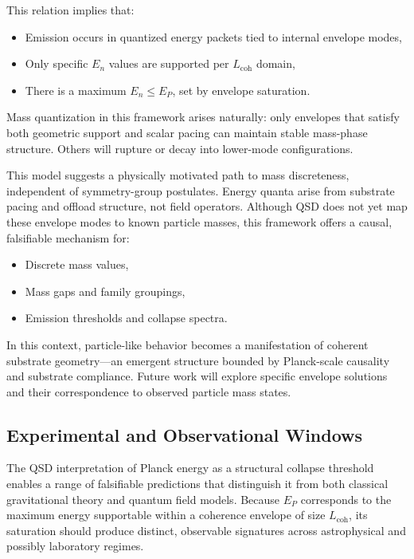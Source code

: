 \documentclass[entropy,article,submit,pdftex,moreauthors]{Definitions/mdpi}
\begin{document}
This relation implies that:
\begin{itemize}
  \item Emission occurs in quantized energy packets tied to internal envelope modes,
  \item Only specific $E_n$ values are supported per $L_{\text{coh}}$ domain,
  \item There is a maximum $E_n \leq E_P$, set by envelope saturation.
\end{itemize}

Mass quantization in this framework arises naturally: only envelopes that satisfy both geometric support and scalar pacing can maintain stable mass-phase structure. Others will rupture or decay into lower-mode configurations.

This model suggests a physically motivated path to mass discreteness, independent of symmetry-group postulates. Energy quanta arise from substrate pacing and offload structure, not field operators. Although QSD does not yet map these envelope modes to known particle masses, this framework offers a causal, falsifiable mechanism for:
\begin{itemize}
  \item Discrete mass values,
  \item Mass gaps and family groupings,
  \item Emission thresholds and collapse spectra.
\end{itemize}

In this context, particle-like behavior becomes a manifestation of coherent substrate geometry—an emergent structure bounded by Planck-scale causality and substrate compliance. Future work will explore specific envelope solutions and their correspondence to observed particle mass states.


\subsection{Experimental and Observational Windows}

The QSD interpretation of Planck energy as a structural collapse threshold enables a range of falsifiable predictions that distinguish it from both classical gravitational theory and quantum field models. Because $E_P$ corresponds to the maximum energy supportable within a coherence envelope of size $L_{\text{coh}}$, its saturation should produce distinct, observable signatures across astrophysical and possibly laboratory regimes.
\end{document}
